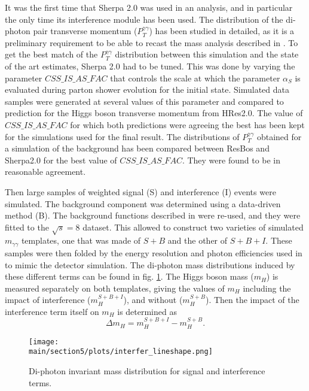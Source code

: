 It was the first time that Sherpa 2.0 was used in an analysis, and in particular the only time its interference module has been used. The distribution of the di-photon pair transverse momentum ($P_T^{\gamma\gamma}$) has been studied in detailed, as it is a preliminary requirement to be able to recast the mass analysis described in \cite{Aad:2014aba}. To get the best match of the $P_T^{\gamma\gamma}$ distribution between this simulation and the state of the art estimates, Sherpa 2.0 had to be tuned. This was done by varying the parameter $CSS\_IS\_AS\_FAC$ that controls the scale at which the parameter $\alpha_S$ is evaluated during parton shower evolution for the initial state. Simulated data samples were generated at several values of this parameter and compared to prediction for the Higgs boson transverse momentum from HRes2.0. The value of $CSS\_IS\_AS\_FAC$ for which both predictions were agreeing the best has been kept for the simulations used for the final result. The distributions of $P_T^{\gamma\gamma}$ obtained for a simulation of the background has been compared between ResBos and Sherpa2.0 for the best value of $CSS\_IS\_AS\_FAC$. They were found to be in reasonable agreement.

Then large samples of weighted signal (S) and interference (I) events were simulated. The background component was determined using a data-driven method (B). The background functions described in \cite{Aad:2014aba} were re-used, and they were fitted to the $\sqrt{s} = 8$ \UTeV dataset. This allowed to construct two varieties of simulated $m_{\gamma\gamma}$ templates, one that was made of $S+B$ and the other of $S+B+I$. These samples were then folded by the energy resolution and photon efficiencies used in \cite{Aad:2014aba} to mimic the detector simulation. The di-photon mass distributions induced by these different terms can be found in fig. \ref{fig:interfer_lineshape}. The Higgs boson mass ($m_H$) is measured separately on both templates, giving the values of $m_H$ including the impact of interference ($m_H^{S+B+I}$), and without ($m_H^{S+B}$). Then the impact of the interference term itself on $m_H$ is determined as \begin{equation}
    \Delta m_H = m_H^{S+B+I}-m_H^{S+B}.
\end{equation}

\begin{figure}
    \centering
    \texttt{[image: \\main/section5/plots/interfer\_lineshape.png]}
    \caption{Di-photon invariant mass distribution for signal and interference terms.}
    \label{fig:interfer_lineshape}
\end{figure}

